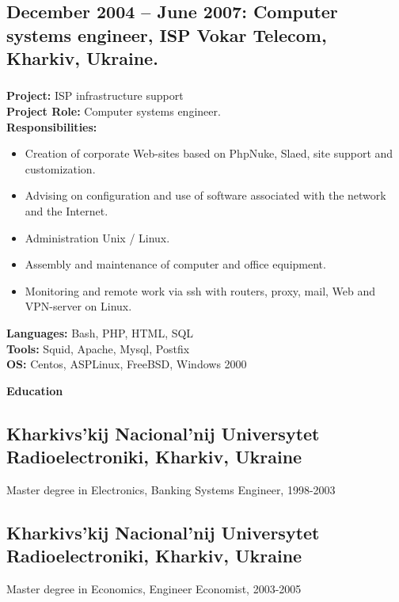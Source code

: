 \documentclass[letterpaper]{article}
\renewcommand{\section}[1]{
  {
    \large \colorbox{my-gray}{
      \begin{minipage}
        {\textwidth-0.175in}
        {\textbf{#1 \vphantom{p\^{E}}}}
      \end{minipage}
    }
  }
}
\begin{document}
\subsection{December 2004 – June 2007: Computer systems engineer, ISP Vokar Telecom, Kharkiv, Ukraine.}
\label{sec-2-4}
\subsubsection{}
\label{sec-2-4-1}
\textbf{Project:} ISP infrastructure support\\
\textbf{Project Role:}  Computer systems engineer.\\
\textbf{Responsibilities:}
\begin{itemize}
\item Creation of corporate Web-sites based on PhpNuke, Slaed, site support and customization.
\item Advising on configuration and use of software associated with the network and the Internet.
\item Administration Unix / Linux.
\item Assembly and maintenance of computer and office equipment.
\item Monitoring and remote work via ssh with routers, proxy, mail, Web and VPN-server on Linux.
\end{itemize}
\textbf{Languages:} Bash, PHP, HTML, SQL\\
\textbf{Tools:}  Squid, Apache, Mysql, Postfix\\
\textbf{OS:} Centos, ASPLinux, FreeBSD, Windows 2000\\
\section{Education}
\label{sec-4}
\subsection{Kharkivs'kij Nacional'nij Universytet Radioelectroniki, Kharkiv, Ukraine}
\label{sec-4-1}
Master degree in Electronics, Banking Systems Engineer, 1998-2003\\
\subsection{Kharkivs'kij Nacional'nij Universytet Radioelectroniki, Kharkiv, Ukraine}
\label{sec-4-1}
Master degree in Economics, Engineer Economist, 2003-2005\\
\end{document}

